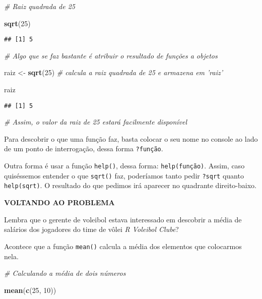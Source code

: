 \documentclass[
]{article}
\newenvironment{Shaded}{\begin{snugshade}}{\end{snugshade}}
\newcommand{\CommentTok}[1]{\textcolor[rgb]{0.56,0.35,0.01}{\textit{#1}}}
\newcommand{\DecValTok}[1]{\textcolor[rgb]{0.00,0.00,0.81}{#1}}
\newcommand{\KeywordTok}[1]{\textcolor[rgb]{0.13,0.29,0.53}{\textbf{#1}}}
\newcommand{\NormalTok}[1]{#1}
\newcommand{\StringTok}[1]{\textcolor[rgb]{0.31,0.60,0.02}{#1}}
\begin{document}
\begin{Shaded}
\begin{Highlighting}[]
\CommentTok{# Raiz quadrada de 25}

\KeywordTok{sqrt}\NormalTok{(}\DecValTok{25}\NormalTok{)}
\end{Highlighting}
\end{Shaded}

\begin{verbatim}
## [1] 5
\end{verbatim}

\begin{Shaded}
\begin{Highlighting}[]
\CommentTok{# Algo que se faz bastante é atribuir o resultado de funções a objetos }

\NormalTok{raiz <-}\StringTok{ }\KeywordTok{sqrt}\NormalTok{(}\DecValTok{25}\NormalTok{) }\CommentTok{# calcula a raiz quadrada de 25 e armazena em 'raiz'}

\NormalTok{raiz}
\end{Highlighting}
\end{Shaded}

\begin{verbatim}
## [1] 5
\end{verbatim}

\begin{Shaded}
\begin{Highlighting}[]
\CommentTok{# Assim, o valor da raiz de 25 estará facilmente disponível}
\end{Highlighting}
\end{Shaded}

Para descobrir o que uma função faz, basta colocar o seu nome no console
ao lado de um ponto de interrogação, dessa forma \texttt{?função}.

Outra forma é usar a função \texttt{help()}, dessa forma:
\texttt{help(função)}. Assim, caso quiséssemos entender o que
\texttt{sqrt()} faz, poderíamos tanto pedir \texttt{?sqrt} quanto
\texttt{help(sqrt)}. O resultado do que pedimos irá aparecer no
quadrante direito-baixo.

\textbf{VOLTANDO AO PROBLEMA}

Lembra que o gerente de voleibol estava interessado em descobrir a média
de salários dos jogadores do time de vôlei \emph{R Voleibol Clube}?

Acontece que a função \texttt{mean()} calcula a média dos elementos que
colocarmos nela.

\begin{Shaded}
\begin{Highlighting}[]
\CommentTok{# Calculando a média de dois números}

\KeywordTok{mean}\NormalTok{(}\KeywordTok{c}\NormalTok{(}\DecValTok{25}\NormalTok{, }\DecValTok{10}\NormalTok{))}
\end{Highlighting}
\end{Shaded}
\end{document}
